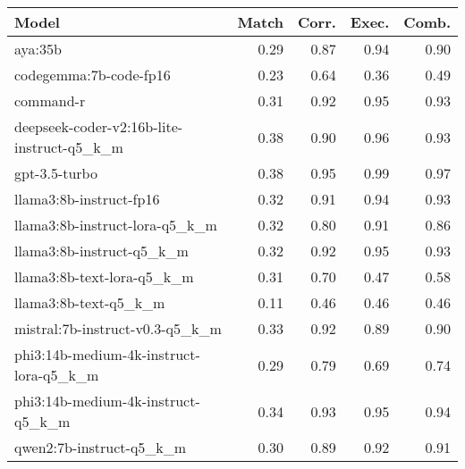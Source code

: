 \begin{tabular}{lrrrr}
\toprule
Model & Match & Corr. & Exec. & Comb. \\
\midrule
aya:35b & 0.29 & 0.87 & 0.94 & 0.90 \\
codegemma:7b-code-fp16 & 0.23 & 0.64 & 0.36 & 0.49 \\
command-r & 0.31 & 0.92 & 0.95 & 0.93 \\
deepseek-coder-v2:16b-lite-instruct-q5\_k\_m & 0.38 & 0.90 & 0.96 & 0.93 \\
gpt-3.5-turbo & 0.38 & 0.95 & 0.99 & 0.97 \\
llama3:8b-instruct-fp16 & 0.32 & 0.91 & 0.94 & 0.93 \\
llama3:8b-instruct-lora-q5\_k\_m & 0.32 & 0.80 & 0.91 & 0.86 \\
llama3:8b-instruct-q5\_k\_m & 0.32 & 0.92 & 0.95 & 0.93 \\
llama3:8b-text-lora-q5\_k\_m & 0.31 & 0.70 & 0.47 & 0.58 \\
llama3:8b-text-q5\_k\_m & 0.11 & 0.46 & 0.46 & 0.46 \\
mistral:7b-instruct-v0.3-q5\_k\_m & 0.33 & 0.92 & 0.89 & 0.90 \\
phi3:14b-medium-4k-instruct-lora-q5\_k\_m & 0.29 & 0.79 & 0.69 & 0.74 \\
phi3:14b-medium-4k-instruct-q5\_k\_m & 0.34 & 0.93 & 0.95 & 0.94 \\
qwen2:7b-instruct-q5\_k\_m & 0.30 & 0.89 & 0.92 & 0.91 \\
\bottomrule
\end{tabular}
